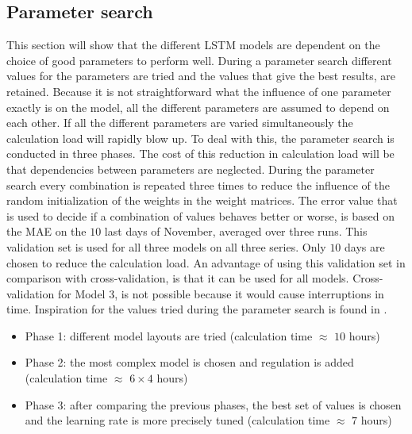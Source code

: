 \subsection{Parameter search}\label{s:Parameter search}
This section will show that the different LSTM models are dependent on the choice of good parameters to perform well. During a parameter search different values for the parameters are tried and the values that give the best results, are retained. Because it is not straightforward what the influence of one parameter exactly is on the model, all the different parameters are assumed to depend on each other. If all the different parameters are varied simultaneously the calculation load will rapidly blow up. To deal with this, the parameter search is conducted in three phases. The cost of this reduction in calculation load will be that dependencies between parameters are neglected. During the parameter search every combination is repeated three times to reduce the influence of the random initialization of the weights in the weight matrices. The error value that is used to decide if a combination of values behaves better or worse, is based on the MAE on the $ 10 $ last days of November, averaged over three runs. This validation set is used for all three models on all three series. Only $ 10 $ days are chosen to reduce the calculation load. An advantage of using this validation set in comparison with cross-validation, is that it can be used for all models. Cross-validation for Model 3, is not possible because it would cause interruptions in time. Inspiration for the values tried during the parameter search is found in \cite{Shi2018}.

\begin{itemize}
	\item Phase 1: different model layouts are tried (calculation time $ \approx $ $ 10 $ hours)
	\item Phase 2: the most complex model is chosen and regulation is added (calculation time $ \approx $ $ 6\times4 $ hours)
	\item Phase 3: after comparing the previous phases, the best set of values is chosen and the learning rate is more precisely tuned (calculation time $ \approx $ $7$ hours)
\end{itemize}

